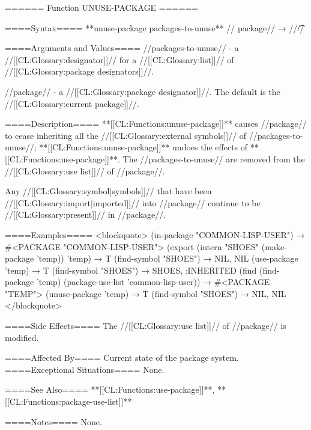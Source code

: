 ====== Function UNUSE-PACKAGE ======

====Syntax====
**unuse-package {packages-to-unuse** //\opt} package// → //\t//

====Arguments and Values====
//packages-to-unuse// - a //[[CL:Glossary:designator]]// for a //[[CL:Glossary:list]]// of //[[CL:Glossary:package designators]]//.

//package// - a //[[CL:Glossary:package designator]]//. The default is the //[[CL:Glossary:current package]]//.

====Description====
**[[CL:Functions:unuse-package]]** causes //package// to cease inheriting all the //[[CL:Glossary:external symbols]]// of //packages-to-unuse//; **[[CL:Functions:unuse-package]]** undoes the effects of **[[CL:Functions:use-package]]**. The //packages-to-unuse// are removed from the //[[CL:Glossary:use list]]// of //package//.

Any //[[CL:Glossary:symbol|symbols]]// that have been //[[CL:Glossary:import|imported]]// into //package// continue to be //[[CL:Glossary:present]]// in //package//.

====Examples====
<blockquote> (in-package "COMMON-LISP-USER") → #<PACKAGE "COMMON-LISP-USER"> (export (intern "SHOES" (make-package 'temp)) 'temp) → T (find-symbol "SHOES") → NIL, NIL (use-package 'temp) → T (find-symbol "SHOES") → SHOES, :INHERITED (find (find-package 'temp) (package-use-list 'common-lisp-user)) → #<PACKAGE "TEMP"> (unuse-package 'temp) → T (find-symbol "SHOES") → NIL, NIL </blockquote>

====Side Effects====
The //[[CL:Glossary:use list]]// of //package// is modified.

====Affected By==== Current state of the package system. ====Exceptional Situations====
None.

====See Also====
**[[CL:Functions:use-package]]**, **[[CL:Functions:package-use-list]]**

====Notes====
None.

